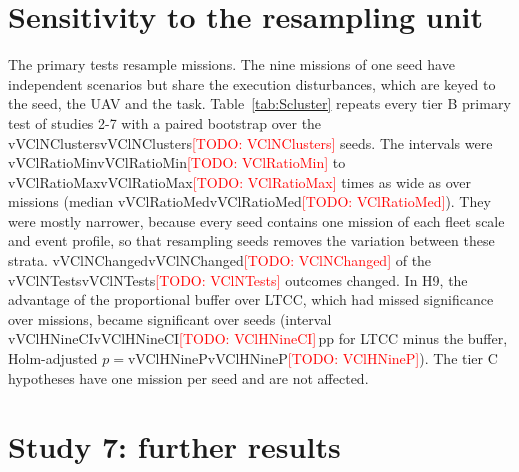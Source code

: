 \documentclass[a4paper,10pt]{article}
\newcounter{prop}
\newcommand{\todo}[1]{\textcolor{red}{[TODO: #1]}}
\newcommand{\mname}{LTCC}  %
\newcommand{\val}[1]{\ifcsname v#1\endcsname\csname v#1\endcsname\else\todo{#1}\fi}
\newcommand{\uprighttext}{\def\textbf##1{##1}\def\textit##1{##1}}
\newcommand{\inputtable}[1]{\begingroup\uprighttext\endgroup}
\begin{document}
\section{Sensitivity to the resampling unit}\label{sec:Scluster}
The primary tests resample missions. The nine missions of one seed have independent scenarios but share the execution
disturbances, which are keyed to the seed, the UAV and the task. Table~\ref{tab:Scluster} repeats every tier B primary
test of studies 2-7 with a paired bootstrap over the \val{VClNClusters} seeds. The intervals were \val{VClRatioMin} to
\val{VClRatioMax} times as wide as over missions (median \val{VClRatioMed}). They were mostly narrower, because every
seed contains one mission of each fleet scale and event profile, so that resampling seeds removes the variation between
these strata. \val{VClNChanged} of the \val{VClNTests} outcomes changed. In H9, the advantage of the proportional buffer
over \mname{}, which had missed significance over missions, became significant over seeds (interval
\val{VClHNineCI}\,pp for \mname{} minus the buffer, Holm-adjusted $p={}$\val{VClHNineP}). The tier C
hypotheses have one mission per seed and are not affected.

\inputtable{tabm_cluster}

\section{Study 7: further results}\label{sec:Sstudy7}

\end{document}
